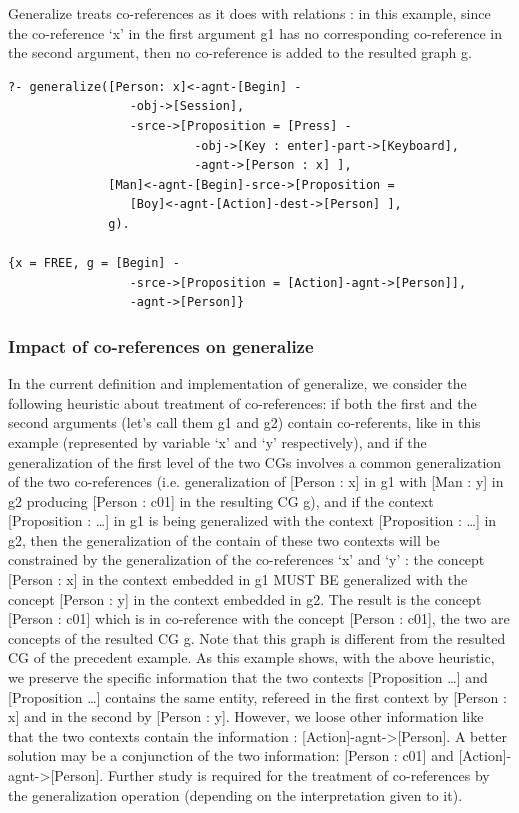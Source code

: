 \documentclass{book}
\begin{document}
Generalize treats co-references as it does with relations : in this
example, since the co-reference `x' in the first argument g1 has no
corresponding co-reference in the second argument, then no
co-reference is added to the resulted graph g.


\begin{verbatim}
?- generalize([Person: x]<-agnt-[Begin] -
                 -obj->[Session],
                 -srce->[Proposition = [Press] -
                          -obj->[Key : enter]-part->[Keyboard],
                          -agnt->[Person : x] ],
              [Man]<-agnt-[Begin]-srce->[Proposition = 
                 [Boy]<-agnt-[Action]-dest->[Person] ], 
              g).

{x = FREE, g = [Begin] -
                 -srce->[Proposition = [Action]-agnt->[Person]],
                 -agnt->[Person]}
\end{verbatim}


\subsubsection{Impact of co-references on generalize} 

In the current definition and implementation of generalize, we
consider the following heuristic about treatment of co-references: if
both the first and the second arguments (let's call them g1 and g2)
contain co-referents, like in this example (represented by variable
`x' and `y' respectively), and if the generalization of the first
level of the two CGs involves a common generalization of the two
co-references (i.e. generalization of [Person : x] in g1 with [Man :
y] in g2 producing [Person : c01] in the resulting CG g), and if the
context [Proposition : \ldots{}] in g1 is being generalized with the
context [Proposition : \ldots{}] in g2, then the generalization of the
contain of these two contexts will be constrained by the
generalization of the co-references `x' and `y' : the concept [Person
: x] in the context embedded in g1 MUST BE generalized with the
concept [Person : y] in the context embedded in g2. The result is the
concept [Person : c01] which is in co-reference with the concept
[Person : c01], the two are concepts of the resulted CG g. Note that
this graph is different from the resulted CG of the precedent
example. As this example shows, with the above heuristic, we preserve
the specific information that the two contexts [Proposition \ldots{}]
and [Proposition \ldots{}] contains the same entity, refereed in the
first context by [Person : x] and in the second by [Person :
y]. However, we loose other information like that the two contexts
contain the information : [Action]-agnt->[Person]. A better solution
may be a conjunction of the two information: [Person : c01] and
[Action]-agnt->[Person]. Further study is required for the treatment
of co-references by the generalization operation (depending on the
interpretation given to it).
\end{document}
